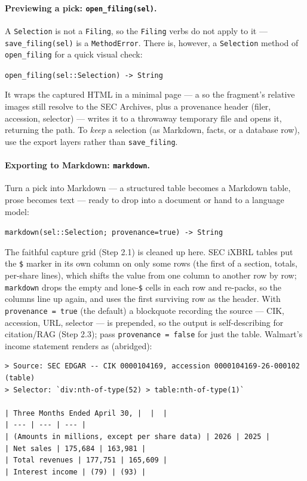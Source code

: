 \documentclass[11pt,a4paper]{report}
\newcommand{\sig}[1]{\medskip\noindent\texttt{#1}\par\medskip}
\begin{document}
\paragraph{Previewing a pick: \texttt{open\_filing(sel)}.} A \texttt{Selection} is not a
\texttt{Filing}, so the \texttt{Filing} verbs do not apply to it --- \texttt{save\_filing(sel)}
is a \texttt{MethodError}. There is, however, a \texttt{Selection} method of
\texttt{open\_filing} for a quick visual check:

\sig{open\_filing(sel::Selection) -> String}

\noindent It wraps the captured HTML in a minimal page --- a  so the
fragment's relative images still resolve to the SEC Archives, plus a provenance header
(filer, accession, selector) --- writes it to a throwaway temporary file and opens it,
returning the path. To \emph{keep} a selection (as Markdown, facts, or a database row), use
the export layers rather than \texttt{save\_filing}.

\paragraph{Exporting to Markdown: \texttt{markdown}.} Turn a pick into Markdown --- a
structured table becomes a Markdown table, prose becomes text --- ready to drop into a
document or hand to a language model:

\sig{markdown(sel::Selection; provenance=true) -> String}

\noindent The faithful capture grid (Step 2.1) is cleaned up here. SEC iXBRL tables put
the \texttt{\$} marker in its own column on only some rows (the first of a section,
totals, per-share lines), which shifts the value from one column to another row by row;
\texttt{markdown} drops the empty and lone-\texttt{\$} cells in each row and re-packs, so
the columns line up again, and uses the first surviving row as the header. With
\texttt{provenance = true} (the default) a blockquote recording the source --- CIK,
accession, URL, selector --- is prepended, so the output is self-describing for
citation/RAG (Step 2.3); pass \texttt{provenance = false} for just the table. Walmart's
income statement renders as (abridged):

\begin{verbatim}
> Source: SEC EDGAR -- CIK 0000104169, accession 0000104169-26-000102 (table)
> Selector: `div:nth-of-type(52) > table:nth-of-type(1)`

| Three Months Ended April 30, |  |  |
| --- | --- | --- |
| (Amounts in millions, except per share data) | 2026 | 2025 |
| Net sales | 175,684 | 163,981 |
| Total revenues | 177,751 | 165,609 |
| Interest income | (79) | (93) |
\end{verbatim}
\end{document}

